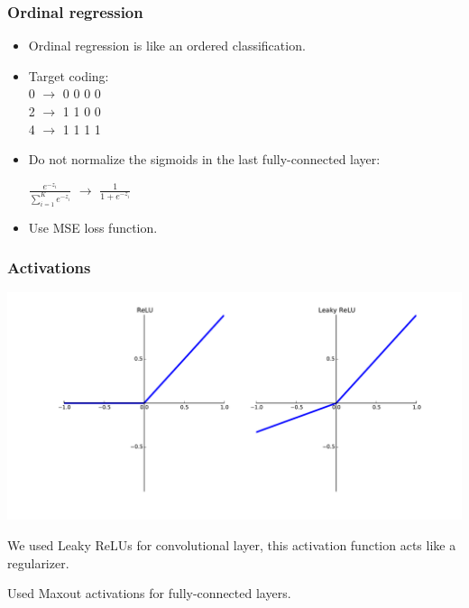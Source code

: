 \begin{frame}\frametitle{Ordinal regression}

\vspace{-0.75cm}

\begin{itemize}

\item Ordinal regression is like an ordered classification.
\item Target coding: \\\vspace{0.25cm}
0 $\rightarrow$  0 0 0 0\\
2 $\rightarrow$  1 1 0 0\\
4 $\rightarrow$  1 1 1 1\\
\item Do not normalize the sigmoids in the last fully-connected layer:\\\vspace{0.5cm}
\begin{center}
\begin{Large}
$\frac{e^{-z_i}}{\sum\limits_{i=1}^Ke^{-z_i}}$ $\rightarrow$ $\frac{1}{1 + e^{-z_i}}$
\end{Large}
\end{center}
\item Use MSE loss function.
\end{itemize}
\end{frame}


\begin{frame}\frametitle{Activations}
\vspace{-2cm}
\begin{center}
\includegraphics[valign=t,scale=0.2]{pics/relus.pdf}
\end{center}
\par We used Leaky ReLUs for convolutional layer, this activation function acts like a regularizer.
\par Used Maxout activations for fully-connected layers.
\end{frame}



